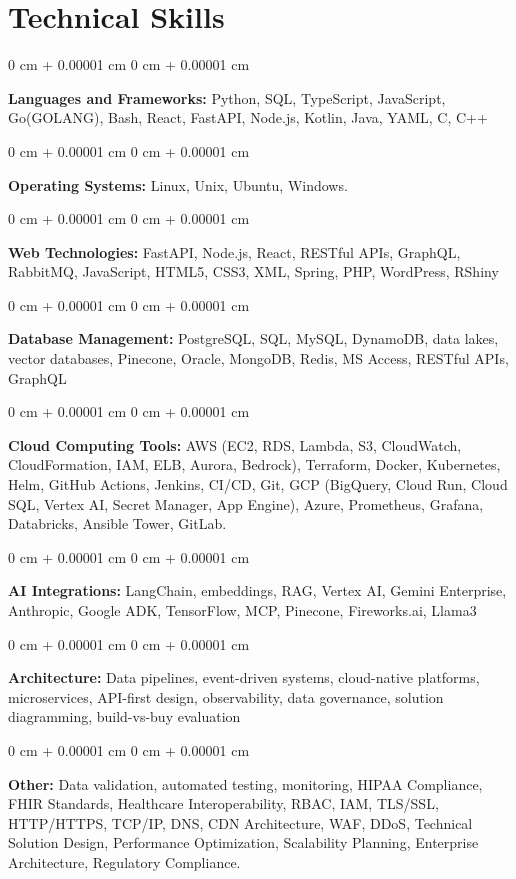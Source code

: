 \documentclass[10pt, letterpaper]{article}
\newenvironment{onecolentry}{
    \begin{adjustwidth}{
        0 cm + 0.00001 cm
    }{
        0 cm + 0.00001 cm
    }
}{
    \end{adjustwidth}
} %
\begin{document}
    \section{Technical Skills}
    \vspace{2 pt }
    \begin{onecolentry}
    \textbf{Languages and Frameworks:} Python, SQL, TypeScript, JavaScript, Go(GOLANG), Bash, React, FastAPI, Node.js, Kotlin, Java, YAML, C, C++
    \end{onecolentry}
    \begin{onecolentry}
        \textbf{Operating Systems:} Linux, Unix, Ubuntu, Windows.
    \end{onecolentry}
    \begin{onecolentry}
         \textbf{Web Technologies:} FastAPI, Node.js, React, RESTful APIs, GraphQL, RabbitMQ, JavaScript, HTML5, CSS3, XML, Spring, PHP, WordPress, RShiny \end{onecolentry}
    \begin{onecolentry}
        \textbf{Database Management:} PostgreSQL, SQL, MySQL, DynamoDB, data lakes, vector databases, Pinecone, Oracle, MongoDB, Redis, MS Access, RESTful APIs, GraphQL \end{onecolentry}
    \begin{onecolentry}
        \textbf{Cloud Computing Tools:}
AWS (EC2, RDS, Lambda, S3, CloudWatch, CloudFormation, IAM, ELB, Aurora, Bedrock), Terraform, Docker, Kubernetes, Helm, GitHub Actions, Jenkins, CI/CD, Git, GCP (BigQuery, Cloud Run, Cloud SQL, Vertex AI, Secret Manager, App Engine), Azure, Prometheus, Grafana, Databricks, Ansible Tower, GitLab.
    \end{onecolentry}
    \begin{onecolentry}
         \textbf{AI Integrations:} LangChain, embeddings, RAG, Vertex AI, Gemini Enterprise, Anthropic, Google ADK, TensorFlow, MCP, Pinecone, Fireworks.ai, Llama3 \end{onecolentry}
    \begin{onecolentry}
        \textbf{Architecture:} Data pipelines, event-driven systems, cloud-native platforms, microservices, API-first design, observability, data governance, solution diagramming, build-vs-buy evaluation \end{onecolentry}
        \begin{onecolentry}
     \textbf{Other:} Data validation, automated testing, monitoring, HIPAA Compliance, FHIR Standards, Healthcare Interoperability, RBAC, IAM, TLS/SSL, HTTP/HTTPS, TCP/IP, DNS, CDN Architecture, WAF, DDoS, Technical Solution Design, Performance Optimization, Scalability Planning, Enterprise Architecture, Regulatory Compliance.
    \end{onecolentry}
\end{document}
